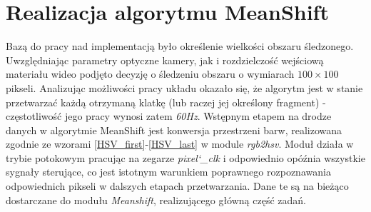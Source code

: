  
\section{Realizacja algorytmu MeanShift}
Bazą do pracy nad implementacją było określenie wielkości obszaru śledzonego. Uwzględniając parametry optyczne kamery, jak i rozdzielczość wejściową materiału wideo podjęto decyzję o śledzeniu obszaru o wymiarach $100 \times 100$ pikseli. Analizując możliwości pracy układu okazało się, że algorytm jest w stanie przetwarzać każdą otrzymaną klatkę (lub raczej jej określony fragment) - częstotliwość jego pracy wynosi zatem \textit{60Hz}.\newline
Wstępnym etapem na drodze danych w algorytmie MeanShift jest konwersja przestrzeni barw, realizowana zgodnie ze wzorami \ref{HSV_first}-\ref{HSV_last} w module \textit{rgb2hsv}. Moduł działa w trybie potokowym pracując na zegarze \textit{pixel\char`_clk} i odpowiednio opóźnia wszystkie sygnały sterujące, co jest istotnym warunkiem poprawnego rozpoznawania odpowiednich pikseli w dalszych etapach przetwarzania.
Dane te są na bieżąco dostarczane do modułu \textit{Meanshift}, realizującego główną część zadań. 

